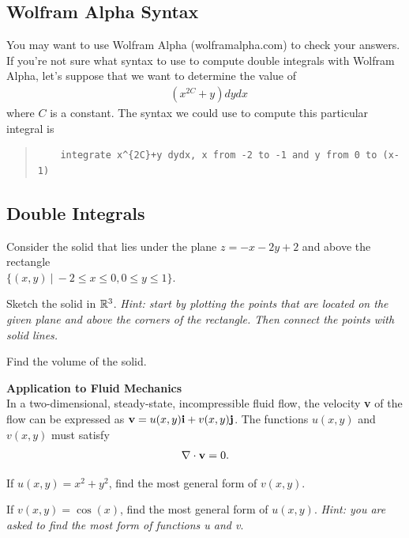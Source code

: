 \setcounter{subsection}{-1}

\subsection{Wolfram Alpha Syntax}
You may want to use Wolfram Alpha (wolframalpha.com) to check your answers. If you're not sure what syntax to use to compute double integrals with Wolfram Alpha, let's suppose that we want to determine the value of
\begin{align*} 
   \mathop{\int_{-2}^{-1} \!  \int_0^{x-1}}( x^{2C} +y)  dy  dx
\end{align*}
where $C$ is a constant. The syntax we could use to compute this particular integral is
\begin{quote}
  \begin{verbatim}
    integrate x^{2C}+y dydx, x from -2 to -1 and y from 0 to (x-1)
  \end{verbatim}
\end{quote}
\subsection{Double Integrals}

\BEN
\item %
Consider the solid that lies under the plane $z = -x-2y+2$ and above the rectangle \\$\{(x,y) \ | \ -2\le x\le 0, 0\le y \le1 \}$.
\BEN
\item Sketch the solid in $\mathbb{R}^3$. \textit{Hint: start by plotting the points that are located on the given plane and above the corners of the rectangle. Then connect the points with solid lines.}
\item Find the volume of the solid.
\EEN
\item %
\textbf{Application to Fluid Mechanics} \\
In a two-dimensional, steady-state, incompressible fluid flow, the velocity \textbf{v} of the flow can be expressed as $\mathbf{v} = u(x,y)\mathbf{i} + v(x,y)\mathbf{j}$. The functions $u(x,y)$ and $v(x,y)$ must satisfy 
\begin{align*}
  \nabla\cdot\mathbf{v} = 0.
\end{align*}
\BEN
\item If $u(x,y) = x^2 + y^2$, find the most general form of $v(x,y)$. 
\item If $v(x,y) = \cos(x)$, find the most general form of $u(x,y)$.
\EEN
\textit{Hint: you are asked to find the most  form of functions u and v}.

